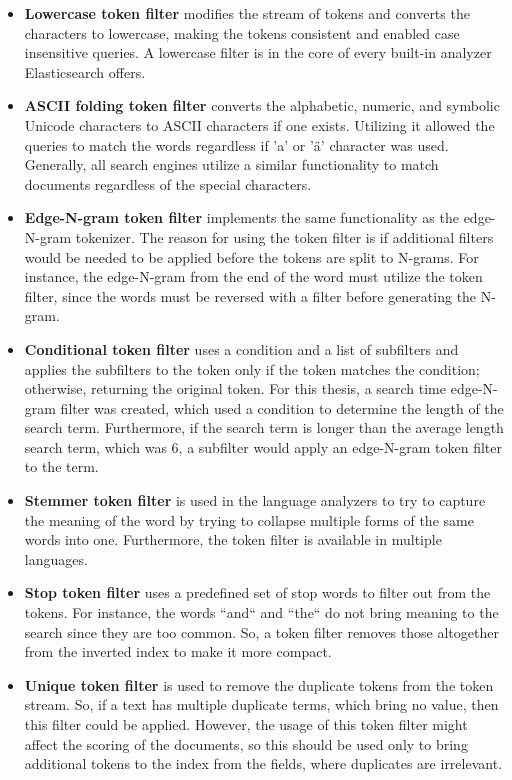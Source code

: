 \begin{itemize}
    \item \textbf{Lowercase token filter} modifies the stream of tokens and converts the characters to lowercase,
    making the tokens consistent and enabled case insensitive queries.
    A lowercase filter is in the core of every built-in analyzer Elasticsearch offers.
    
    \item \textbf{ASCII folding token filter} converts the alphabetic, numeric, and symbolic Unicode characters
    to ASCII characters if one exists. 
    Utilizing it allowed the queries to match the words regardless if 'a' or 'ä' character was used.
    Generally, all search engines utilize a similar functionality to match documents regardless
    of the special characters.
    
    \item \textbf{Edge-N-gram token filter} implements the same functionality as the edge-N-gram tokenizer.
    The reason for using the token filter is if additional filters would be needed to be applied before 
    the tokens are split to N-grams.
    For instance, the edge-N-gram from the end of the word must utilize the token filter, since the 
    words must be reversed with a filter before generating the N-gram.
    
    \item \textbf{Conditional token filter} uses a condition and a list of subfilters and applies the 
    subfilters to the token only if the token matches the condition; otherwise, returning the original token.
    For this thesis, a search time edge-N-gram filter was created, which used a condition to determine 
    the length of the search term.
    Furthermore, if the search term is longer than the average length search term, which was 6, 
    a subfilter would apply an edge-N-gram token filter to the term.
    
    \item \textbf{Stemmer token filter} is used in the language analyzers to try to capture the
    meaning of the word by trying to collapse multiple forms of the same words into one.
    Furthermore, the token filter is available in multiple languages.
    
    \item \textbf{Stop token filter} uses a predefined set of stop words to filter out from the tokens.
    For instance, the words ``and`` and ``the`` do not bring meaning to the search since they are too common.
    So, a token filter removes those altogether from the inverted index to make it more compact.
    
    \item \textbf{Unique token filter} is used to remove the duplicate tokens from the token stream. 
    So, if a text has multiple duplicate terms, which bring no value, then this filter could be applied.
    However, the usage of this token filter might affect the scoring of the documents, 
    so this should be used only to bring additional tokens to the index from the fields, 
    where duplicates are irrelevant.
    
\end{itemize}



